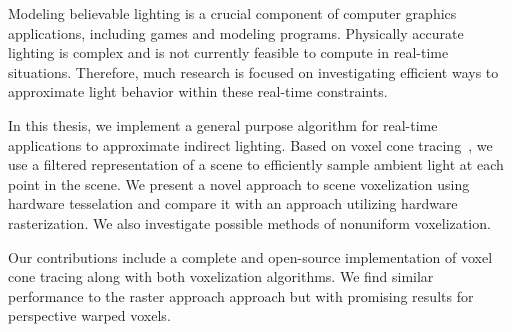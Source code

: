 Modeling believable lighting is a crucial component of computer graphics applications, including games and modeling programs. Physically accurate lighting is complex and is not currently feasible to compute in real-time situations. Therefore, much research is focused on investigating efficient ways to approximate light behavior within these real-time constraints.

In this thesis, we implement a general purpose algorithm for real-time applications to approximate indirect lighting. Based on voxel cone tracing~\cite{crassin2011interactive}, we use a filtered representation of a scene to efficiently sample ambient light at each point in the scene. We present a novel approach to scene voxelization using hardware tesselation and compare it with an approach utilizing hardware rasterization. We also investigate possible methods of nonuniform voxelization.

Our contributions include a complete and open-source implementation of voxel cone tracing along with both voxelization algorithms. We find similar performance to the raster approach approach but with promising results for perspective warped voxels.


